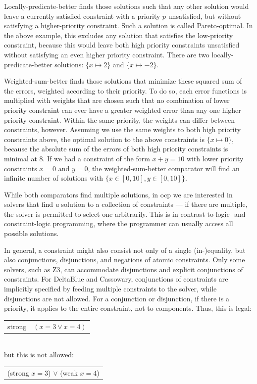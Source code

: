 Locally-predicate-better finds those solutions such that any other
solution would leave a currently satisfied constraint with a priority
$p$ unsatisfied, but without satisfying a higher-priority
constraint. Such a solution is called Pareto-optimal. In the above
example, this excludes any solution that satisfies the low-priority
constraint, because this would leave both high priority constraints
unsatisfied without satisfying an even higher priority
constraint. There are two locally-predicate-better solutions:
$\{x \mapsto 2\}$ and $\{x \mapsto -2\}$.

Weighted-sum-better finds those solutions that minimize these squared
sum of the errors, weighted according to their priority. To do so,
each error functions is multiplied with weights that are chosen such
that no combination of lower priority constraint can ever have a
greater weighted error than any one higher priority constraint. Within
the same priority, the weights can differ between constraints,
however. Assuming we use the same weights to both high priority
constraints above, the optimal solution to the above constraints is
$\{x \mapsto 0\}$, because the absolute sum of the errors of both high
priority constraints is minimal at $8$. If we had a constraint of the
form $x+y=10$ with lower priority constraints $x=0$ and $y=0$, the
weighted-sum-better comparator will find an infinite number of
solutions with $\{x \in [0,10], y \in [0,10]\}$.

While both comparators find multiple solutions, in \acrlong{ocp} we
are interested in solvers that find \emph{a} solution to a collection
of constraints --- if there are multiple, the solver is permitted to
select one arbitrarily. This is in contrast to logic- and
constraint-logic programming, where the programmer can usually access
all possible solutions.

In general, a constraint might also consist not only of a single
(in-)equality, but also conjunctions, disjunctions, and negations of
atomic constraints. Only some solvers, such as Z3, can accommodate
disjunctions and explicit conjunctions of constraints.  For DeltaBlue
and Cassowary, conjunctions of constraints are implicitly specified by
feeding multiple constraints to the solver, while disjunctions are not
allowed. For a conjunction or disjunction, if there is a priority, it
applies to the entire constraint, not to components.  Thus, this is
legal:\\
{\centering
  \begin{tabular}{rl}
    strong & $(x=3 \vee x=4)$
  \end{tabular}
}\\
but this is not allowed:\\
{\centering
  \begin{tabular}{l}
    (strong $x=3$) $\vee$ (weak $x=4$)
  \end{tabular}
}

